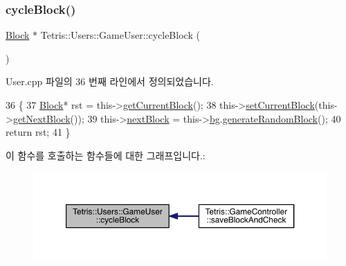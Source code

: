 \subsubsection{\texorpdfstring{cycle\+Block()}{cycleBlock()}\hspace{0.1cm}{\footnotesize\ttfamily [1/2]}}
{\footnotesize\ttfamily \hyperlink{class_tetris_1_1_block}{Block} $\ast$ Tetris\+::\+Users\+::\+Game\+User\+::cycle\+Block (\begin{DoxyParamCaption}{ }\end{DoxyParamCaption})}



User.\+cpp 파일의 36 번째 라인에서 정의되었습니다.


\begin{DoxyCode}
36                                    \{
37                      \hyperlink{class_tetris_1_1_block}{Block}* rst = this->\hyperlink{class_tetris_1_1_users_1_1_game_user_a3d4bcc74d518c28356012f8a42b85896}{getCurrentBlock}();
38                     this->\hyperlink{class_tetris_1_1_users_1_1_game_user_ae1743f8024d25ed74d7b2e456907ee41}{setCurrentBlock}(this->\hyperlink{class_tetris_1_1_users_1_1_game_user_a9300608a38f8a3b10f9d6b6bdaeaab18}{getNextBlock}());
39                     this->\hyperlink{class_tetris_1_1_users_1_1_game_user_a49be97be588cd4b6438f06ec693787d5}{nextBlock} = this->\hyperlink{class_tetris_1_1_users_1_1_game_user_ad57a39d1716322764d92ff76f08ebcd5}{bg}.\hyperlink{class_tetris_1_1_block_generator_a10dfe1467d40437ad41c5ae76437ad78}{generateRandomBlock}();
40                     \textcolor{keywordflow}{return} rst;
41                 \}
\end{DoxyCode}
이 함수를 호출하는 함수들에 대한 그래프입니다.\+:
\nopagebreak
\begin{figure}[H]
\begin{center}
\leavevmode
\includegraphics[width=350pt]{d8/d9a/class_tetris_1_1_users_1_1_game_user_a5efbd1ed9fa84a4041c218fb32463c36_icgraph}
\end{center}
\end{figure}
\mbox{\label{class_tetris_1_1_users_1_1_game_user_a6011fe9738235fa93fac51db4fafdbd7}} 
